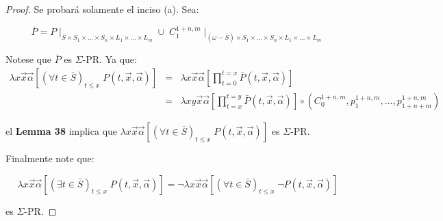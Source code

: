   \begin{proof}
    \PN Se probará solamente el inciso (a). Sea:

    \[
      \bar{P} = P \mid_{\bar{S} \times S_{1} \times \dotsc \times S_{n} \times L_{1} \times \dotsc \times L_{m}} \cup \;
      C_{1}^{1+n,m} \mid_{(\omega -\bar{S}) \times S_{1} \times \dotsc \times S_{n} \times L_{1} \times \dotsc \times
      L_{m}}
    \]

    \PN Notese que $\bar{P}$ es $\Sigma$-PR. Ya que:
    \begin{eqnarray*}
      \lambda x\vec{x}\vec{\alpha}\left[(\forall t \in \bar{S})_{t\leq x} \; P(t,\vec{x},\vec{\alpha})\right]
        &=& \lambda x\vec{x}\vec{\alpha}\left[\prod\limits_{t=0}^{t=x}\bar{P}(t,\vec{x},\vec{\alpha})\right] \\
      &=& \lambda xy\vec{x}\vec{\alpha}\left[\prod\limits_{t=x}^{t=y} \bar{P}(t,\vec{x},\vec{\alpha})\right]
        \circ \left(C_{0}^{1+n,m}, p_{1}^{1+n,m}, \dotsc, p_{1+n+m}^{1+n,m}\right)
    \end{eqnarray*}

    \PN el \textbf{Lemma 38} implica que $\lambda x\vec{x}\vec{\alpha}\left[(\forall t\in \bar{S})_{t\leq x} \;
    P(t,\vec{x},\vec{\alpha})\right]$ es $\Sigma$-PR.

    \PN Finalmente note que:

    \[
      \lambda x\vec{x}\vec{\alpha}\left[(\exists t \in \bar{S})_{t\leq x} \; P(t,\vec{x},\vec{\alpha})\right] = \lnot
      \lambda x\vec{x}\vec{\alpha}\left[(\forall t \in \bar{S})_{t\leq x} \; \lnot P(t,\vec{x},\vec{\alpha})\right]
    \]

    \PN es $\Sigma$-PR.
  \end{proof}

